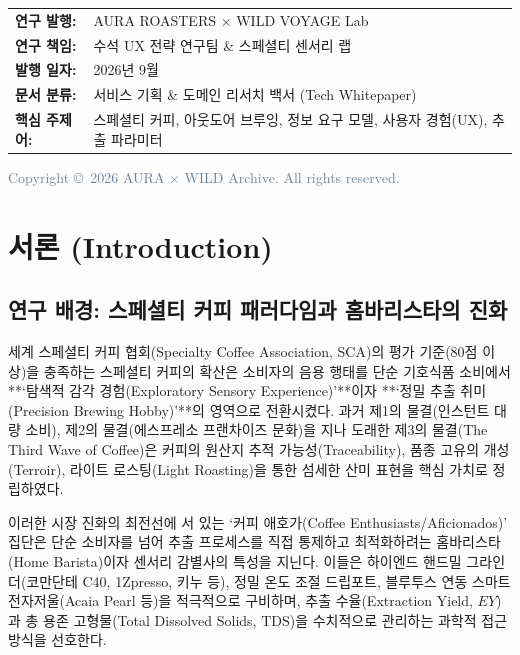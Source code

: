 \documentclass[10pt,a4paper]{article}
\begin{document}
\begin{titlepage}
    \vspace{1.5cm}
    
    \begin{minipage}{0.85\textwidth}
    \begin{tabular}{ll}
    \textbf{연구 발행:} & AURA ROASTERS × WILD VOYAGE Lab\\
    \textbf{연구 책임:} & 수석 UX 전략 연구팀 \& 스페셜티 센서리 랩\\
    \textbf{발행 일자:} & 2026년 9월\\
    \textbf{문서 분류:} & 서비스 기획 \& 도메인 리서치 백서 (Tech Whitepaper)\\
    \textbf{핵심 주제어:} & 스페셜티 커피, 아웃도어 브루잉, 정보 요구 모델, 사용자 경험(UX), 추출 파라미터
    \end{tabular}
    \end{minipage}
    
    \vfill
    {\footnotesize\textcolor{SlateGray}{Copyright \copyright\ 2026 AURA × WILD Archive. All rights reserved.}}
\end{titlepage}

\tableofcontents
\newpage

\section{서론 (Introduction)}

\subsection{연구 배경: 스페셜티 커피 패러다임과 홈바리스타의 진화}
세계 스페셜티 커피 협회(Specialty Coffee Association, SCA)의 평가 기준(80점 이상)을 충족하는 스페셜티 커피의 확산은 소비자의 음용 행태를 단순 기호식품 소비에서 **‘탐색적 감각 경험(Exploratory Sensory Experience)’**이자 **‘정밀 추출 취미(Precision Brewing Hobby)’**의 영역으로 전환시켰다. 과거 제1의 물결(인스턴트 대량 소비), 제2의 물결(에스프레소 프랜차이즈 문화)을 지나 도래한 제3의 물결(The Third Wave of Coffee)은 커피의 원산지 추적 가능성(Traceability), 품종 고유의 개성(Terroir), 라이트 로스팅(Light Roasting)을 통한 섬세한 산미 표현을 핵심 가치로 정립하였다.

이러한 시장 진화의 최전선에 서 있는 ‘커피 애호가(Coffee Enthusiasts/Aficionados)’ 집단은 단순 소비자를 넘어 추출 프로세스를 직접 통제하고 최적화하려는 홈바리스타(Home Barista)이자 센서리 감별사의 특성을 지닌다. 이들은 하이엔드 핸드밀 그라인더(코만단테 C40, 1Zpresso, 키누 등), 정밀 온도 조절 드립포트, 블루투스 연동 스마트 전자저울(Acaia Pearl 등)을 적극적으로 구비하며, 추출 수율(Extraction Yield, $EY$)과 총 용존 고형물(Total Dissolved Solids, $\text{TDS}$)을 수치적으로 관리하는 과학적 접근 방식을 선호한다.
\end{document}
